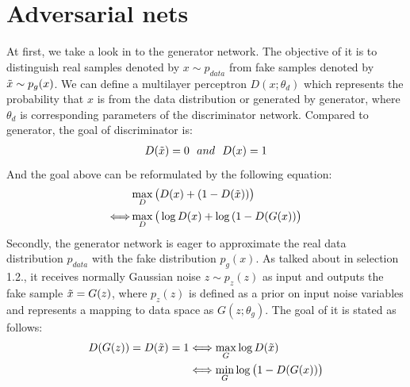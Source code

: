 \documentclass[10pt,twocolumn,letterpaper]{article}
\begin{document}
\section{Adversarial nets}
At first, we take a look in to the generator network. The objective of it is to distinguish real samples denoted by $x \sim p_{data}$ from fake samples denoted by $\Tilde{x} \sim p_g(x)$.  We can define a multilayer perceptron $D(x;\theta_d)$ which represents the probability that $x$ is from the data distribution or generated by generator, where $\theta_d$ is corresponding parameters of the discriminator network. Compared to generator, the goal of discriminator is: 
\begin{align*}
    D(\Tilde{x}) = 0 \ \ and \ \  D(x) = 1
\end{align*}
And the goal above can be reformulated by the following equation: 
\begin{align*}
    &\max\limits_{D}\big(D(x) + (1-D(\Tilde{x}))\big)\\
    \Longleftrightarrow &\max\limits_{D}\big(\log{D(x)} + \log{(1-D(G(x))}\big)
\end{align*} 
Secondly, the generator network is eager to approximate the real data distribution $p_{data}$ with the fake distribution $p_g(x)$. As talked about in selection 1.2., it receives normally Gaussian noise $z \sim p_z(z)$ as input and outputs the fake sample $\Tilde{x} = G(z)$, where $p_z(z)$ is defined as a prior on input noise variables and represents a mapping to data space as $G(z;\theta_g)$. The goal of it is stated as follows: 
\begin{align*}
    D(G(z)) = D(\Tilde{x}) = 1 
    &\Longleftrightarrow \max\limits_G\log{D(\Tilde{x})} \\
    &\Longleftrightarrow \min\limits_G\log{\big(1 - D(G(x))\big)}
\end{align*}
\end{document}
